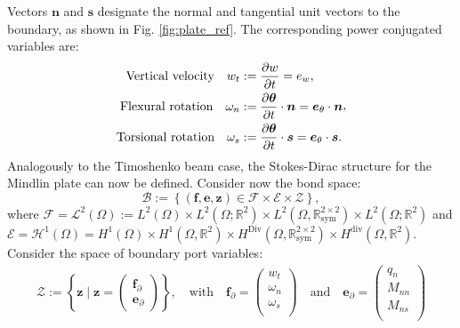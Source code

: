 {	Vectors $\bm{n}$ and $\bm{s}$ designate the normal and tangential unit vectors to the boundary, as shown in Fig. \ref{fig:plate_ref}. The corresponding power conjugated variables are:
	\begin{equation}
	\label{eq:wtwnws}
	\begin{aligned}
	\text{Vertical velocity}  \quad w_t &:= \diffp{w}{t} = e_w, \\
	\text{Flexural rotation} \quad 
	\omega_{n} &:= \diffp{\bm{\theta}}{t} \cdot \bm{n} = \bm{e}_\theta \cdot \bm{n} \\
	\text{Torsional rotation} \quad 
	\omega_{s} &:= \diffp{\bm{\theta}}{t} \cdot \bm{s} = \bm{e}_\theta \cdot \bm{s}.	
	\end{aligned},
	\end{equation}
	Analogously to the Timoshenko beam case, the Stokes-Dirac structure for the Mindlin plate can now be defined. Consider now the bond space:
	\begin{equation}
	\label{eq:bondMin}
	\mathcal{B} := \left\{(\bm{f}, \bm{e}, \bm{z}) \in \mathcal{F} \times \mathcal{E} \times \mathcal{Z} \right\},
	\end{equation}
	where $\mathcal{F}=  \mathscr{L}^2(\Omega) := 
	L^2(\Omega) \times L^2(\Omega; \mathbb{R}^2) \times L^2(\Omega, \mathbb{R}^{2 \times 2}_{\text{sym}}) \times L^2(\Omega; \mathbb{R}^2)$ and $ \mathcal{E} =  \mathscr{H}^1(\Omega) = H^{1}(\Omega) \times H^{1}(\Omega, \mathbb{R}^2) \times H^{\text{Div}}(\Omega, \mathbb{R}^{2 \times 2}_{\text{sym}}) \times H^{\text{div}}(\Omega, \mathbb{R}^2)$. Consider the space of boundary port variables:
	\begin{equation}
	\begin{gathered}
	\mathcal{Z} := \left\{ \bm{z} \; \vert \; \bm{z} = \begin{pmatrix} \bm{f}_{\partial} \\ \bm{e}_{\partial} \end{pmatrix} \right\}, \quad \text{with} \quad
	\bm{f}_\partial = 
	\begin{pmatrix}
	w_t \\ \omega_{n} \\ \omega_{s} \\
	\end{pmatrix} \quad \text{and} \quad
	\bm{e}_\partial = 
	\begin{pmatrix}
	q_n \\ M_{nn} \\ M_{ns} \\
	\end{pmatrix}

\end{gathered}
\end{equation}}
